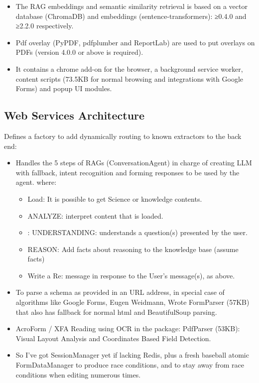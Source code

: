 \documentclass[conference]{IEEEtran}
\begin{document}
\begin{itemize}
    \item The RAG embeddings and semantic similarity retrieval is based on a vector database (ChromaDB) and embeddings (sentence-transformers): ≥0.4.0 and ≥2.2.0 respectively.

    \item Pdf overlay (PyPDF, pdfplumber and ReportLab) are used to put overlays on PDFs (version 4.0.0 or above is required).

    \item It contains a chrome add-on for the browser, a background service worker, content scripts (73.5KB for normal browsing and integrations with Google Forms) and popup UI modules.

\end{itemize}

\subsection{Web Services Architecture}

Defines a factory to add dynamically routing to known extractors to the back end:

\begin{itemize}

    \item Handles the 5 steps of RAGs (ConversationAgent) in charge of creating LLM with fallback, intent recognition and forming responses to be used by the agent.
    where:
    \begin{itemize}
        \item Load: It is possible to get Science or knowledge contents.
        \item ANALYZE: interpret content that is loaded.
        \item : UNDERSTANDING: understands a question(s) presented by the user.
        \item REASON: Add facts about reasoning to the knowledge base (assume facts)
        \item Write a Re: message in response to the User's message(s), as above.
    \end{itemize}

    \item To parse a schema as provided in an URL address, in special case of algorithms like Google Forms, Eugen Weidmann, Wrote FormParser (57KB) that also has fallback for normal html and BeautifulSoup parsing.

    \item AcroForm / XFA Reading using OCR in the package: PdfParser (53KB): Visual Layout Analysis and Coordinates Based Field Detection.

    \item So I've got SessionManager yet if lacking Redis, plus a fresh baseball atomic FormDataManager to produce race conditions, and to stay away from race conditions when editing numerous times.

\end{itemize}
\end{document}
